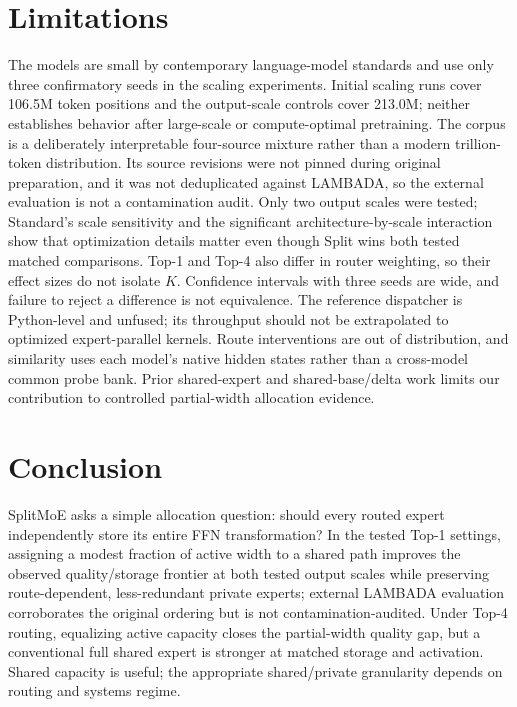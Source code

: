 \documentclass[10pt]{article}
\begin{document}
\section{Limitations}
The models are small by contemporary language-model standards and use only three confirmatory seeds in the scaling experiments. Initial scaling runs cover 106.5M token positions and the output-scale controls cover 213.0M; neither establishes behavior after large-scale or compute-optimal pretraining. The corpus is a deliberately interpretable four-source mixture rather than a modern trillion-token distribution. Its source revisions were not pinned during original preparation, and it was not deduplicated against LAMBADA, so the external evaluation is not a contamination audit. Only two output scales were tested; Standard's scale sensitivity and the significant architecture-by-scale interaction show that optimization details matter even though Split wins both tested matched comparisons. Top-1 and Top-4 also differ in router weighting, so their effect sizes do not isolate $K$. Confidence intervals with three seeds are wide, and failure to reject a difference is not equivalence. The reference dispatcher is Python-level and unfused; its throughput should not be extrapolated to optimized expert-parallel kernels. Route interventions are out of distribution, and similarity uses each model's native hidden states rather than a cross-model common probe bank. Prior shared-expert and shared-base/delta work limits our contribution to controlled partial-width allocation evidence.

\section{Conclusion}
SplitMoE asks a simple allocation question: should every routed expert independently store its entire FFN transformation? In the tested Top-1 settings, assigning a modest fraction of active width to a shared path improves the observed quality/storage frontier at both tested output scales while preserving route-dependent, less-redundant private experts; external LAMBADA evaluation corroborates the original ordering but is not contamination-audited. Under Top-4 routing, equalizing active capacity closes the partial-width quality gap, but a conventional full shared expert is stronger at matched storage and activation. Shared capacity is useful; the appropriate shared/private granularity depends on routing and systems regime.
\end{document}
